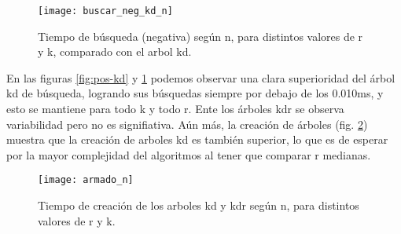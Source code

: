 \begin{figure}
  \begin{center}
  \texttt{[image: buscar\_neg\_kd\_n]}
  \caption{Tiempo de búsqueda (negativa)
    según n, para distintos valores de r y k, comparado con el arbol kd.}
  \label{fig:neg-kd}
  \end{center}
\end{figure}


En las figuras \ref{fig:pos-kd} y \ref{fig:neg-kd} podemos observar
una clara superioridad del árbol kd de búsqueda, logrando sus
búsquedas siempre por debajo de los 0.010ms, y esto se mantiene para
todo k y todo r. Ente los árboles kdr se observa variabilidad pero no
es signifiativa. Aún más, la creación de árboles
(fig. \ref{fig:armado}) muestra que la creación de arboles kd es
también superior, lo que es de esperar por la mayor complejidad del
algoritmos al tener que comparar r medianas.


\begin{figure}
  \begin{center}
  \texttt{[image: armado\_n]}
  \caption{Tiempo de creación de los arboles kd y kdr
    según n, para distintos valores de r y k.}
  \label{fig:armado}
  \end{center}
\end{figure}
